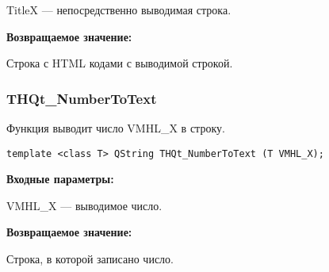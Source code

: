 \documentclass[a4paper,12pt]{article}
\begin{document}
TitleX --- непосредственно выводимая строка.

\textbf{Возвращаемое значение:}

Строка с HTML кодами с выводимой строкой.


\subsubsection{THQt\_NumberToText}\label{THQt_NumberToText}

Функция выводит число VMHL\_X в строку.


\begin{lstlisting}[label=code_syntax_THQt_NumberToText,caption=Синтаксис]
template <class T> QString THQt_NumberToText (T VMHL_X);
\end{lstlisting}

\textbf{Входные параметры:}

VMHL\_X --- выводимое число.

\textbf{Возвращаемое значение:}

Строка, в которой записано число.
\end{document}
